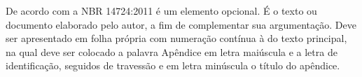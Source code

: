 
De acordo com a NBR 14724:2011 é um elemento opcional. É o texto ou documento elaborado pelo autor, a fim de complementar sua argumentação. Deve ser apresentado em folha própria com numeração contínua à do texto principal, na qual deve ser colocado a palavra Apêndice em letra maiúscula e a letra de identificação, seguidos de travessão e em letra minúscula o título do apêndice.
\clearpage
\newpage